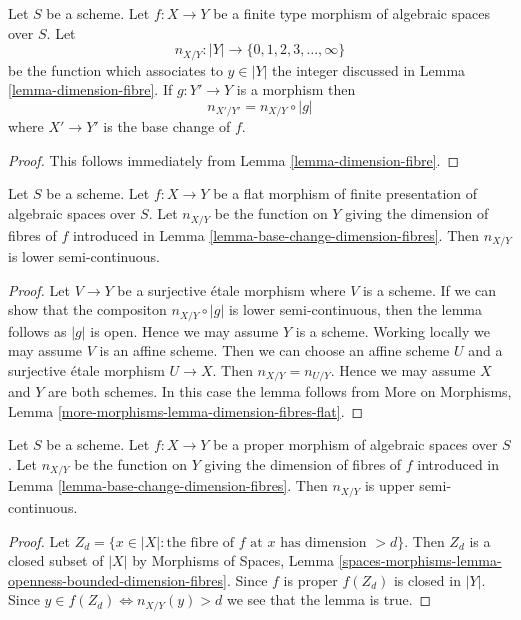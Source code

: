 \begin{lemma}
\label{lemma-base-change-dimension-fibres}
Let $S$ be a scheme. Let $f : X \to Y$ be a finite type morphism of
algebraic spaces over $S$. Let
$$
n_{X/Y} : |Y| \to \{0, 1, 2, 3, \ldots, \infty\}
$$
be the function which associates to $y \in |Y|$ the
integer discussed in Lemma \ref{lemma-dimension-fibre}.
If $g : Y' \to Y$ is a morphism then
$$
n_{X'/Y'} = n_{X/Y} \circ |g|
$$
where $X' \to Y'$ is the base change of $f$.
\end{lemma}

\begin{proof}
This follows immediately from
Lemma \ref{lemma-dimension-fibre}.
\end{proof}

\begin{lemma}
\label{lemma-dimension-fibres-flat}
Let $S$ be a scheme.
Let $f : X \to Y$ be a flat morphism of finite presentation of
algebraic spaces over $S$. Let
$n_{X/Y}$ be the function on $Y$ giving the dimension of fibres of $f$
introduced in Lemma \ref{lemma-base-change-dimension-fibres}.
Then $n_{X/Y}$ is lower semi-continuous.
\end{lemma}

\begin{proof}
Let $V \to Y$ be a surjective \'etale morphism where $V$ is a scheme.
If we can show that the compositon $n_{X/Y} \circ |g|$
is lower semi-continuous, then the lemma follows as $|g|$ is open.
Hence we may assume $Y$ is a scheme.
Working locally we may assume $V$ is an affine scheme.
Then we can choose an affine scheme $U$ and a surjective
\'etale morphism $U \to X$. Then $n_{X/Y} = n_{U/Y}$.
Hence we may assume $X$ and $Y$ are both schemes.
In this case the lemma follows from
More on Morphisms, Lemma \ref{more-morphisms-lemma-dimension-fibres-flat}.
\end{proof}

\begin{lemma}
\label{lemma-dimension-fibres-proper}
Let $S$ be a scheme.
Let $f : X \to Y$ be a proper morphism of algebraic spaces over $S$. Let
$n_{X/Y}$ be the function on $Y$ giving the dimension of fibres of $f$
introduced in Lemma \ref{lemma-base-change-dimension-fibres}.
Then $n_{X/Y}$ is upper semi-continuous.
\end{lemma}

\begin{proof}
Let $Z_d = \{x \in |X| :
\text{the fibre of }f\text{ at }x\text{ has dimension }> d\}$.
Then $Z_d$ is a closed subset of $|X|$ by
Morphisms of Spaces, Lemma
\ref{spaces-morphisms-lemma-openness-bounded-dimension-fibres}.
Since $f$ is proper $f(Z_d)$ is closed in $|Y|$.
Since $y \in f(Z_d) \Leftrightarrow n_{X/Y}(y) > d$
we see that the lemma is true.
\end{proof}

